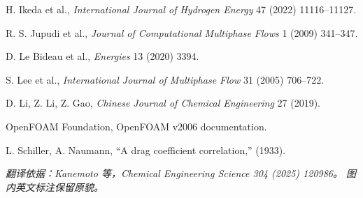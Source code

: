 \documentclass[UTF8,zihao=-4,fontset=fandol]{ctexart}
\begin{document}
\begin{enumerate}[label={[\arabic*]},leftmargin=2.7em,itemsep=0.12em]
\item H. Ikeda et al., \emph{International Journal of Hydrogen Energy} 47 (2022) 11116--11127.
\item R. S. Jupudi et al., \emph{Journal of Computational Multiphase Flows} 1 (2009) 341--347.
\item D. Le Bideau et al., \emph{Energies} 13 (2020) 3394.
\item S. Lee et al., \emph{International Journal of Multiphase Flow} 31 (2005) 706--722.
\item D. Li, Z. Li, Z. Gao, \emph{Chinese Journal of Chemical Engineering} 27 (2019).
\item OpenFOAM Foundation, OpenFOAM v2006 documentation.
\item L. Schiller, A. Naumann, ``A drag coefficient correlation,'' (1933).
\end{enumerate}
\normalsize

\vfill
\begin{center}\small\itshape
翻译依据：Kanemoto 等，\emph{Chemical Engineering Science} 304 (2025) 120986。
图内英文标注保留原貌。
\end{center}
\end{document}
